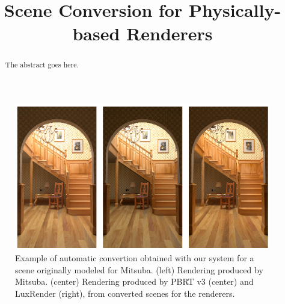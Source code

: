 \documentclass[10pt,conference]{IEEEtran}
\begin{document}
\title{Scene Conversion for Physically-based Renderers}

\newif\iffinal
\finaltrue
\newcommand{\jemsid}{99999}
\iffinal

\author{
\and
{}
}

\else
  \author{SIBGRAPI paper ID: \jemsid \\ }
\fi

\maketitle

\begin{figure}[h]
	\includegraphics[width=1\linewidth]{figs/4_results/teaser_staircase.png}
	\centering
	\caption{Example of automatic convertion obtained with our system for a scene originally modeled for Mitsuba. (left) Rendering produced by Mitsuba. (center) Rendering produced by PBRT v3 (center) and LuxRender (right), from converted scenes for the renderers. }
	\label{fig:cfa_design_autoencoder_idea}
\end{figure}

\begin{abstract}
The abstract goes here.
\end{abstract}
\end{document}
